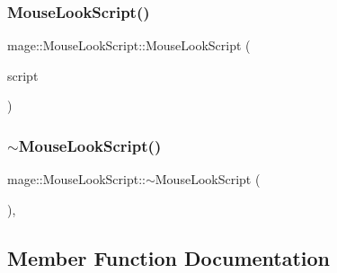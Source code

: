 \hypertarget{classmage_1_1_mouse_look_script_aaca52076bde601772344c61639345e03}{}\label{classmage_1_1_mouse_look_script_aaca52076bde601772344c61639345e03} 
\subsubsection{\texorpdfstring{Mouse\+Look\+Script()}{MouseLookScript()}\hspace{0.1cm}{\footnotesize\ttfamily [3/3]}}
{\footnotesize\ttfamily mage\+::\+Mouse\+Look\+Script\+::\+Mouse\+Look\+Script (\begin{DoxyParamCaption}\item[{\hyperlink{classmage_1_1_mouse_look_script}{Mouse\+Look\+Script} \&\&}]{script }\end{DoxyParamCaption})\hspace{0.3cm}{\ttfamily [default]}}

\hypertarget{classmage_1_1_mouse_look_script_ac402a33218e69d3594102b606dd051dc}{}\label{classmage_1_1_mouse_look_script_ac402a33218e69d3594102b606dd051dc} 
\subsubsection{\texorpdfstring{$\sim$\+Mouse\+Look\+Script()}{~MouseLookScript()}}
{\footnotesize\ttfamily mage\+::\+Mouse\+Look\+Script\+::$\sim$\+Mouse\+Look\+Script (\begin{DoxyParamCaption}{ }\end{DoxyParamCaption})\hspace{0.3cm}{\ttfamily [virtual]}, {\ttfamily [default]}}



\subsection{Member Function Documentation}
\hypertarget{classmage_1_1_mouse_look_script_a644a7b52eccd338aaa141e8a1016c4e2}{}\label{classmage_1_1_mouse_look_script_a644a7b52eccd338aaa141e8a1016c4e2} 
